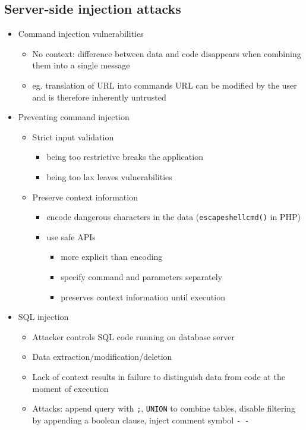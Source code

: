 \documentclass[12pt,titlepage,a4paper]{report}
\begin{document}
	\subsection{Server-side injection attacks}
	\begin{itemize}
		\item Command injection vulnerabilities
		\begin{itemize}
			\item No context: difference between data and code disappears when combining them into a single message
			\item eg. translation of URL into commands
				\subitem URL can be modified by the user and is therefore inherently untrusted
		\end{itemize}
	
		\item Preventing command injection
		\begin{itemize}
			\item Strict input validation
			\begin{itemize}
				\item being too restrictive breaks the application
				\item being too lax leaves vulnerabilities
			\end{itemize}
			\item Preserve context information
			\begin{itemize}
				\item encode dangerous characters in the data (\texttt{escapeshellcmd()} in PHP)
				\item use safe APIs
				\begin{itemize}
					\item more explicit than encoding
					\item specify command and parameters separately
					\item preserves context information until execution
				\end{itemize}
			\end{itemize}
		\end{itemize}
	
		\item SQL injection
		\begin{itemize}
			\item Attacker controls SQL code running on database server
			\item Data extraction/modification/deletion
			\item Lack of context results in failure to distinguish data from code at the moment of execution
			\item Attacks: append query with \texttt{;}, \texttt{UNION} to combine tables, disable filtering by appending a boolean clause, inject comment symbol \texttt{-\,-}
		\end{itemize}


\end{itemize}
\end{document}
